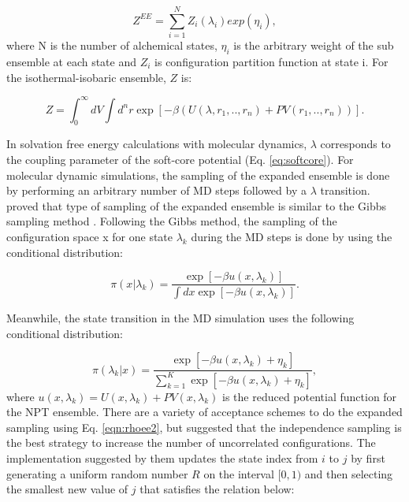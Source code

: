 	\begin{equation}
	Z^{EE} = \sum_{i=1}^{N} Z_{i}(\lambda_{i}) exp(\eta_{i}),
	\label{eqn:ee}
	\end{equation}   
	where N is the number of alchemical states, $\eta_{i}$ is the arbitrary weight of the sub ensemble at each state and $Z_{i}$ is configuration partition function at state i. For the isothermal-isobaric ensemble, $Z$ is:
	
	\begin{equation}
	Z = {\int_{0}^{\infty} dV \int d^{n}r \exp \left[ -\beta \left(U(\lambda, r_{1},..,r_{n}) + PV(r_{1},..,r_{n}) \right) \right]}.
	\end{equation} 
	
	In solvation free energy calculations with molecular dynamics, $\lambda$ corresponds to the coupling parameter of the soft-core potential (Eq. \ref{eq:softcore}). For molecular dynamic simulations, the sampling of the expanded ensemble is done by performing an arbitrary number of MD  steps followed by a $\lambda$ transition.  proved that type of sampling of the expanded ensemble is similar to the Gibbs sampling method \cite{geman1984,liu2002}. Following the Gibbs method, the sampling of the configuration space x for one state $\lambda_{k}$ during the MD steps is done by using the conditional distribution:
	
	\begin{equation}
	\pi(x|\lambda_{k}) = \dfrac{\exp[-\beta u(x,\lambda_{k})]}{\int dx \exp [- \beta u(x,\lambda_{k})]}.
	\label{eqn:rhoee1}
	\end{equation} 
	
	Meanwhile, the state transition in the MD simulation uses the following conditional distribution:
	
	\begin{equation}
	\pi(\lambda_{k}|x) = \dfrac{\exp[-\beta u(x,\lambda_{k}) + \eta_{k}]}{ \sum_{k=1}^{K} \exp [- \beta u(x,\lambda_{k})+ \eta_{k}]},
	\label{eqn:rhoee2}
	\end{equation} 
	where $u(x,\lambda_{k}) = U(x,\lambda_{k}) + PV(x,\lambda_{k})$ is the reduced potential function for the NPT ensemble. There are a variety of acceptance schemes to do the expanded sampling using Eq. \eqref{eqn:rhoee2}, but  suggested that the independence sampling \cite{liu2002} is the best strategy to increase the number of uncorrelated configurations. The implementation suggested by them updates the state index from $i$ to $j$ by first generating a uniform random number $R$ on the interval $[0,1)$ and then selecting the smallest new value of $j$ that satisfies  the relation below:
	
